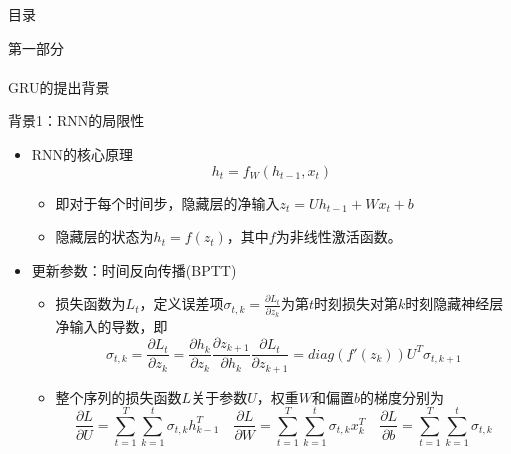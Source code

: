 
\begin{frame}{目录}
        \begin{center}
            \textcolor{NJU_purple}{\Large 第一部分} \\
            \text{\;} \\
            \textcolor{NJU_purple}{\Huge GRU的提出背景} 
        \end{center}      
    \end{frame}

\begin{frame}{背景1：RNN的局限性}
    \begin{itemize}
        \item RNN的核心原理
        \begin{equation*}
            h_t = f_W(h_{t-1}, x_t)
        \end{equation*}
        \begin{itemize}
            \item 即对于每个时间步，隐藏层的净输入\(z_t = Uh_{t-1} + W x_{t} + b\)
            \item 隐藏层的状态为\(h_t = f(z_t)\)，其中\(f\)为非线性激活函数。
        \end{itemize}
        \item 更新参数：时间反向传播(BPTT)
        \begin{itemize}
            \item 损失函数为\(L_t\)，定义误差项\(\sigma_{t,k} = \frac{\partial L_t}{\partial z_k}\)为第\(t\)时刻损失对第\(k\)时刻隐藏神经层净输入的导数，即
            \begin{equation*}
                \sigma_{t,k} = \frac{\partial L_t}{\partial z_k} = \frac{\partial h_k}{\partial z_k} \frac{\partial z_{k + 1}}{\partial h_k} \frac{\partial L_t}{\partial z_{k + 1}} = diag(f'(z_k))U^T \sigma_{t,k+1}
            \end{equation*}
            \item 整个序列的损失函数\(L\)关于参数\(U\)，权重\(W\)和偏置\(b\)的梯度分别为
            \begin{equation*}
                \frac{\partial L}{\partial U} = \sum_{t=1}^{T}\sum_{k=1}^t\sigma_{t,k}h_{k-1}^T \quad \frac{\partial L}{\partial W} = \sum_{t=1}^{T}\sum_{k=1}^t\sigma_{t,k}x_k^T \quad \frac{\partial L}{\partial b} = \sum_{t=1}^{T}\sum_{k=1}^t\sigma_{t,k}
            \end{equation*}
        \end{itemize}
        \end{itemize}
\end{frame}

